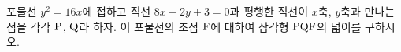 포물선 $y^2=16x$에 접하고 직선 $8x-2y+3=0$과 평행한 직선이 $x$축, $y$축과 만나는 점을 각각 $\mathrm{P}$, $\mathrm{Q}$라 하자. 이 포물선의 초점 $\mathrm{F}$에 대하여 삼각형 $\mathrm{PQF}$의 넓이를 구하시오.
